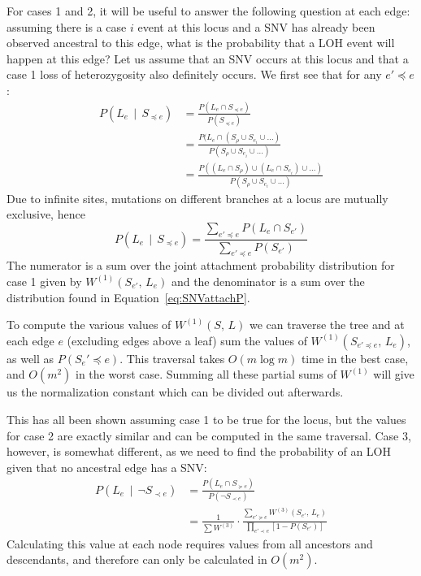 \documentclass[../../main.tex]{subfiles}
\begin{document}
For cases 1 and 2, it will be useful to answer the following question at each edge: assuming there is a case $i$ event at this locus and a SNV has already been observed ancestral to this edge, what is the probability that a LOH event will happen at this edge?
Let us assume that an SNV occurs at this locus and that a case 1 loss of heterozygosity also definitely occurs.
We first see that for any $e'\preceq e$: 
\begin{align*}
    P(L_e\,\mid\,S_{\preceq e}) &= \frac{P(L_e\cap S_{\preceq e})}{P(S_{\preceq e})}\\
    &= \frac{P(L_e\cap(S_\rho \cup S_{e_i} \cup \dots)}{P(S_\rho \cup S_{e_i} \cup \dots)}\\
    &= \frac{P((L_e\cap S_\rho) \cup (L_e\cap S_{e_i}) \cup \dots)}{P(S_\rho \cup S_{e_i} \cup \dots)}
\end{align*}
Due to infinite sites, mutations on different branches at a locus are mutually exclusive, hence
\begin{equation*}
    P(L_e\,\mid\,S_{\preceq e}) = \frac{\sum_{e'\preceq e}P(L_e\cap S_{e'})}{\sum_{e'\preceq e}P(S_{e'})}
\end{equation*}
The numerator is a sum over the joint attachment probability distribution for case 1 given by $W^{(1)} (S_{e'},\,L_e)$ and the denominator is a sum over the distribution found in Equation~\ref{eq:SNVattachP}.

To compute the various values of $W^{(1)}(S,\, L)$ we can traverse the tree and at each edge $e$ (excluding edges above a leaf)  sum the values of $W^{(1)}(S_{e'\preceq e},\,L_e)$, as well as $P(S_e'\preceq e)$.
This traversal takes $O(m\log m)$ time in the best case, and $O(m^2)$ in the worst case.
Summing all these partial sums  of $W^{(1)}$ will give us the normalization constant which can be divided out afterwards.

This has all been shown assuming case 1 to be true for the locus, but the values for case 2 are exactly similar and can be computed in the same traversal.
Case 3, however, is somewhat different, as we need to find the probability of an LOH given that no ancestral edge has a SNV:
\begin{align*}
    P(L_e\,\mid\,\neg S_{\prec e}) &= \frac{P(L_e\cap S_{\succeq e})}{P(\neg S_{\prec e})}\\
   &= \frac{1}{\sum W^{(3)}}\cdot\frac{\sum_{e'\succeq e}W^{(3)}(S_{e'},\,L_e)}{\prod_{e'\prec e}\left[1-P(S_{e'})\right]}
\end{align*}
Calculating this value at each node requires values from all ancestors and descendants, and therefore can only be calculated in $O(m^2)$.
\end{document}
